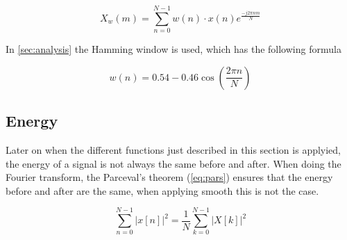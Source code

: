 \begin{equation}
\label{eq:window}
X_w(m) = \sum_{n=0}^{N-1} w(n)\cdot x(n)e^{\frac{-j2\pi nm}{N}}
\end{equation}

In \cref{sec:analysis} the Hamming window is used, which has the following formula

\begin{equation}
\label{eq:hamming}
w(n) = 0.54-0.46\cos\left(\frac{2\pi n}{N}\right)
\end{equation}

\subsection{Energy}
Later on when the different functions just described in this section is applyied, the energy of a signal is not always the same before and after. When doing the Fourier transform, the Parceval's theorem (\cref{eq:pars}) ensures that the energy before and after are the same, when applying smooth this is not the case.

\begin{equation}
	\sum_{n=0}^{N-1}\left|x\left[n\right]\right|^2=\frac{1}{N}\sum_{k=0}^{N-1}\left|X\left[k\right]\right|^2
	\label{eq:pars}
\end{equation}